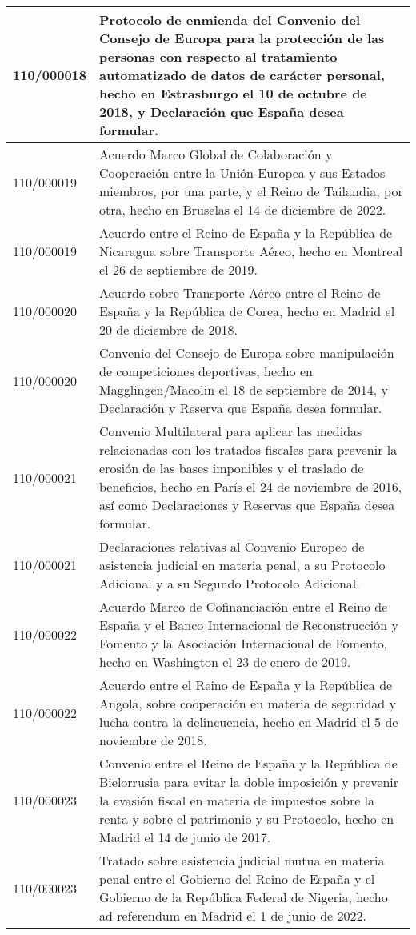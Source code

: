 {\begin{table}[H]
\begin{center}
\begin{tabularx}{\linewidth}{| l | X |}
\hline
110/000018 & Protocolo de enmienda del Convenio del Consejo de Europa para la protección de las personas con respecto al tratamiento automatizado de datos de carácter personal, hecho en Estrasburgo el 10 de octubre de 2018, y Declaración que España desea formular. \\
\hline
110/000019 & Acuerdo Marco Global de Colaboración y Cooperación entre la Unión Europea y sus Estados miembros, por una parte, y el Reino de Tailandia, por otra, hecho en Bruselas el 14 de diciembre de 2022. \\
\hline
110/000019 & Acuerdo entre el Reino de España y la República de Nicaragua sobre Transporte Aéreo, hecho en Montreal el 26 de septiembre de 2019. \\
\hline
110/000020 & Acuerdo sobre Transporte Aéreo entre el Reino de España y la República de Corea, hecho en Madrid el 20 de diciembre de 2018. \\
\hline
110/000020 & Convenio del Consejo de Europa sobre manipulación de competiciones deportivas, hecho en Magglingen/Macolin el 18 de septiembre de 2014, y Declaración y Reserva que España desea formular. \\
\hline
110/000021 & Convenio Multilateral para aplicar las medidas relacionadas con los tratados fiscales para prevenir la erosión de las bases imponibles y el traslado de beneficios, hecho en París el 24 de noviembre de 2016, así como Declaraciones y Reservas que España desea formular. \\
\hline
110/000021 & Declaraciones relativas al Convenio Europeo de asistencia judicial en materia penal, a su Protocolo Adicional y a su Segundo Protocolo Adicional. \\
\hline
110/000022 & Acuerdo Marco de Cofinanciación entre el Reino de España y el Banco Internacional de Reconstrucción y Fomento y la Asociación Internacional de Fomento, hecho en Washington el 23 de enero de 2019. \\
\hline
110/000022 & Acuerdo entre el Reino de España y la República de Angola, sobre cooperación en materia de seguridad y lucha contra la delincuencia, hecho en Madrid el 5 de noviembre de 2018. \\
\hline
110/000023 & Convenio entre el Reino de España y la República de Bielorrusia para evitar la doble imposición y prevenir la evasión fiscal en materia de impuestos sobre la renta y sobre el patrimonio y su Protocolo, hecho en Madrid el 14 de junio de 2017. \\
\hline
110/000023 & Tratado sobre asistencia judicial mutua en materia penal entre el Gobierno del Reino de España y el Gobierno de la República Federal de Nigeria, hecho ad referendum en Madrid el 1 de junio de 2022. \\

\end{tabularx}
\end{center}
\end{table}}
